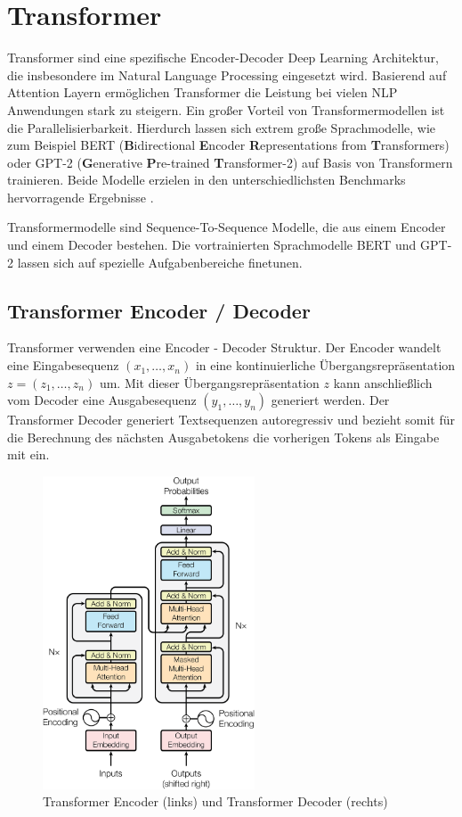 \section{Transformer}\raggedbottom \label{transformer}
Transformer sind eine spezifische Encoder-Decoder Deep Learning Architektur, die insbesondere im Natural Language Processing eingesetzt wird. 
Basierend auf Attention Layern ermöglichen Transformer die Leistung bei vielen NLP Anwendungen stark zu steigern. 
Ein großer Vorteil von Transformermodellen ist die Parallelisierbarkeit. 
Hierdurch lassen sich extrem große Sprachmodelle, wie zum Beispiel BERT (\textbf{B}idirectional \textbf{E}ncoder \textbf{R}epresentations from \textbf{T}ransformers) oder GPT-2 (\textbf{G}enerative \textbf{P}re-trained \textbf{T}ransformer-2) auf Basis von Transformern trainieren. 
Beide Modelle erzielen in den unterschiedlichsten Benchmarks hervorragende Ergebnisse \citep{DBLP:journals/corr/abs-1810-04805}.

Transformermodelle sind Sequence-To-Sequence Modelle, die aus einem Encoder und einem Decoder bestehen.
Die vortrainierten Sprachmodelle BERT und GPT-2 lassen sich auf spezielle Aufgabenbereiche finetunen.


\subsection{Transformer Encoder / Decoder}
Transformer verwenden eine Encoder - Decoder Struktur. Der Encoder wandelt eine Eingabesequenz $(x_1,\ldots,x_n)$ in eine kontinuierliche Übergangsrepräsentation $z=(z_1, \ldots, z_n)$ um. 
Mit dieser Übergangsrepräsentation $z$ kann anschließlich vom Decoder eine Ausgabesequenz $(y_1, \ldots, y_n)$ generiert werden.
Der Transformer Decoder generiert Textsequenzen autoregressiv und bezieht somit für die Berechnung des nächsten Ausgabetokens die vorherigen Tokens als Eingabe mit ein.


\begin{figure}[h]
    
    \centering
    \includegraphics[width=6.3cm]{bilder/Transformer-Encoder-Decoder}
    \caption{Transformer Encoder (links) und Transformer Decoder (rechts) \citep{AttentionIALYN}}
    \label{transformerfig}
\end{figure}

